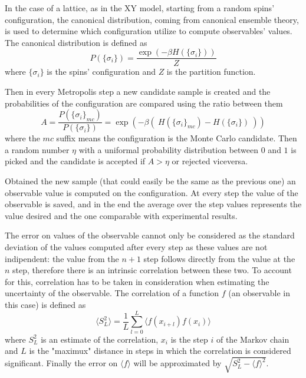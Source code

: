 In the case of a lattice, as in the XY model, starting from a random spins' configuration,
the canonical distribution, coming from canonical ensemble theory, is used to determine which
configuration utilize to compute observables' values. The canonical
distribution is defined as
\begin{equation}
P(\{\sigma_i\}) = \frac{\exp(-\beta H(\{\sigma_i\}))}{Z}
\end{equation}
where $\{\sigma_i\}$ is the spins' configuration and $Z$ is the partition function.

Then in every Metropolis step a new candidate sample is created and the 
probabilities of the configuration are compared using the ratio between them
\begin{equation}
A = \frac{P(\{\sigma_i\}_{mc})}{P(\{\sigma_i\})} = \exp(-\beta (\ H(\{\sigma_i\}_{mc})
- H(\{\sigma_i\})\ ))
\end{equation}
where the $mc$ suffix means the configuration is the Monte Carlo candidate.
Then a random number $\eta$ with a uniformal probability distribution between $0$
and $1$ is picked and the candidate is accepted if $A > \eta$ or rejected viceversa. 

Obtained the new sample (that could easily be the same as the previous one) an observable
value is computed on the configuration. At every step the value of the observable is
saved, and in the end the average over the step values represents the value desired 
and the one comparable with experimental results.

The error on values of the observable cannot only be considered as the standard
deviation of the values computed after every step as these values are not indipendent:
the value from the $n+1$ step follows directly from the value at the $n$ step, therefore
there is an intrinsic correlation between these two. To account for this, correlation
has to be taken in consideration when estimating the uncertainty of the observable.
The correlation of a function $f$ (an observable in this case) is defined as
\begin{equation}
\langle S_L^2 \rangle = \frac{1}{L} \sum_{l=0}^{L} \langle f(x_{i+l}) f(x_i) \rangle
\end{equation}
where $S_L^2$ is an estimate of the correlation, $x_i$ is the step $i$ of the Markov
chain and $L$ is the "maximux" distance in steps in which the correlation is considered
significant. Finally the error on $\langle f \rangle$ will be approximated by 
$\sqrt{S_L^2 - \langle f \rangle^2}$.


